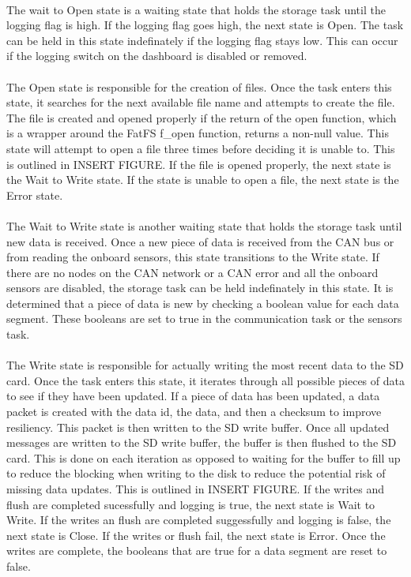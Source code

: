 \paragraph{}
The wait to Open state is a waiting state that holds the storage task until the logging flag is high.
If the logging flag goes high, the next state is Open.
The task can be held in this state indefinately if the logging flag stays low.
This can occur if the logging switch on the dashboard is disabled or removed.

\paragraph{}
The Open state is responsible for the creation of files.
Once the task enters this state, it searches for the next available file name and attempts to create the file.
The file is created and opened properly if the return of the open function, which is a wrapper around the FatFS f\_open function, returns a non-null value.
This state will attempt to open a file three times before deciding it is unable to.
This is outlined in INSERT FIGURE.
If the file is opened properly, the next state is the Wait to Write state.
If the state is unable to open a file, the next state is the Error state.

\paragraph{}
The Wait to Write state is another waiting state that holds the storage task until new data is received.
Once a new piece of data is received from the CAN bus or from reading the onboard sensors, this state transitions to the Write state.
If there are no nodes on the CAN network or a CAN error and all the onboard sensors are disabled, the storage task can be held indefinately in this state.
It is determined that a piece of data is new by checking a boolean value for each data segment.
These booleans are set to true in the communication task or the sensors task.

\paragraph{}
The Write state is responsible for actually writing the most recent data to the SD card.
Once the task enters this state, it iterates through all possible pieces of data to see if they have been updated.
If a piece of data has been updated, a data packet is created with the data id, the data, and then a checksum to improve resiliency.
This packet is then written to the SD write buffer.
Once all updated messages are written to the SD write buffer, the buffer is then flushed to the SD card.
This is done on each iteration as opposed to waiting for the buffer to fill up to reduce the blocking when writing to the disk to reduce the potential risk of missing data updates.
This is outlined in INSERT FIGURE.
If the writes and flush are completed sucessfully and logging is true, the next state is Wait to Write.
If the writes an flush are completed suggessfully and logging is false, the next state is Close.
If the writes or flush fail, the next state is Error.
Once the writes are complete, the booleans that are true for a data segment are reset to false.

